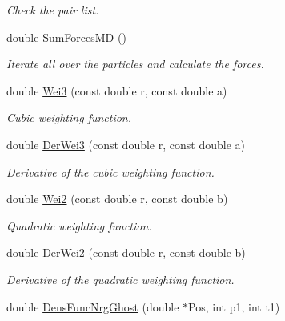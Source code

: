 \begin{DoxyCompactItemize}
\begin{DoxyCompactList}\small\item\em Check the pair list. \end{DoxyCompactList}\item 
double \hyperlink{classForces_a791c1d5f301eb9c0d39c43a180eaf737}{Sum\+Forces\+MD} ()\hypertarget{classForces_a791c1d5f301eb9c0d39c43a180eaf737}{}\label{classForces_a791c1d5f301eb9c0d39c43a180eaf737}

\begin{DoxyCompactList}\small\item\em Iterate all over the particles and calculate the forces. \end{DoxyCompactList}\item 
double \hyperlink{classForces_a5c95469e44bbbea88c38809308ca4551}{Wei3} (const double r, const double a)\hypertarget{classForces_a5c95469e44bbbea88c38809308ca4551}{}\label{classForces_a5c95469e44bbbea88c38809308ca4551}

\begin{DoxyCompactList}\small\item\em Cubic weighting function. \end{DoxyCompactList}\item 
double \hyperlink{classForces_a3d44e49e6ced82a300d6071060b72c48}{Der\+Wei3} (const double r, const double a)\hypertarget{classForces_a3d44e49e6ced82a300d6071060b72c48}{}\label{classForces_a3d44e49e6ced82a300d6071060b72c48}

\begin{DoxyCompactList}\small\item\em Derivative of the cubic weighting function. \end{DoxyCompactList}\item 
double \hyperlink{classForces_a2a275bbffe53c778eb8d535f3dc601f8}{Wei2} (const double r, const double b)\hypertarget{classForces_a2a275bbffe53c778eb8d535f3dc601f8}{}\label{classForces_a2a275bbffe53c778eb8d535f3dc601f8}

\begin{DoxyCompactList}\small\item\em Quadratic weighting function. \end{DoxyCompactList}\item 
double \hyperlink{classForces_a5c07d0e26deb83592ec816a9d6dfd05b}{Der\+Wei2} (const double r, const double b)\hypertarget{classForces_a5c07d0e26deb83592ec816a9d6dfd05b}{}\label{classForces_a5c07d0e26deb83592ec816a9d6dfd05b}

\begin{DoxyCompactList}\small\item\em Derivative of the quadratic weighting function. \end{DoxyCompactList}\item 
double \hyperlink{classForces_a6330de60f8b181b6e7ac68f9cd103f58}{Dens\+Func\+Nrg\+Ghost} (double $\ast$Pos, int p1, int t1)\hypertarget{classForces_a6330de60f8b181b6e7ac68f9cd103f58}{}\label{classForces_a6330de60f8b181b6e7ac68f9cd103f58}


\end{DoxyCompactItemize}
